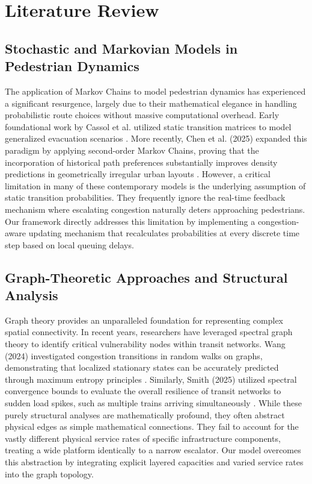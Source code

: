 \documentclass[conference]{IEEEtran}
\begin{document}
\section{Literature Review}

\subsection{Stochastic and Markovian Models in Pedestrian Dynamics}
The application of Markov Chains to model pedestrian dynamics has experienced a significant resurgence, largely due to their mathematical elegance in handling probabilistic route choices without massive computational overhead. Early foundational work by Cassol et al. utilized static transition matrices to model generalized evacuation scenarios \cite{b4}. More recently, Chen et al. (2025) expanded this paradigm by applying second-order Markov Chains, proving that the incorporation of historical path preferences substantially improves density predictions in geometrically irregular urban layouts \cite{b1}. However, a critical limitation in many of these contemporary models is the underlying assumption of static transition probabilities. They frequently ignore the real-time feedback mechanism where escalating congestion naturally deters approaching pedestrians. Our framework directly addresses this limitation by implementing a congestion-aware updating mechanism that recalculates probabilities at every discrete time step based on local queuing delays.

\subsection{Graph-Theoretic Approaches and Structural Analysis}
Graph theory provides an unparalleled foundation for representing complex spatial connectivity. In recent years, researchers have leveraged spectral graph theory to identify critical vulnerability nodes within transit networks. Wang (2024) investigated congestion transitions in random walks on graphs, demonstrating that localized stationary states can be accurately predicted through maximum entropy principles \cite{b3}. Similarly, Smith (2025) utilized spectral convergence bounds to evaluate the overall resilience of transit networks to sudden load spikes, such as multiple trains arriving simultaneously \cite{b5}. While these purely structural analyses are mathematically profound, they often abstract physical edges as simple mathematical connections. They fail to account for the vastly different physical service rates of specific infrastructure components, treating a wide platform identically to a narrow escalator. Our model overcomes this abstraction by integrating explicit layered capacities and varied service rates into the graph topology.
\end{document}
